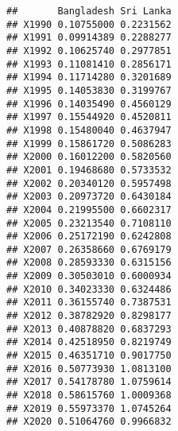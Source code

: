 \documentclass[
]{article}
\newenvironment{Shaded}{\begin{snugshade}}{\end{snugshade}}
\newcommand{\AttributeTok}[1]{\textcolor[rgb]{0.13,0.29,0.53}{#1}}
\newcommand{\CommentTok}[1]{\textcolor[rgb]{0.56,0.35,0.01}{\textit{#1}}}
\newcommand{\DecValTok}[1]{\textcolor[rgb]{0.00,0.00,0.81}{#1}}
\newcommand{\FunctionTok}[1]{\textcolor[rgb]{0.13,0.29,0.53}{\textbf{#1}}}
\newcommand{\NormalTok}[1]{#1}
\newcommand{\OtherTok}[1]{\textcolor[rgb]{0.56,0.35,0.01}{#1}}
\newcommand{\SpecialCharTok}[1]{\textcolor[rgb]{0.81,0.36,0.00}{\textbf{#1}}}
\newcommand{\StringTok}[1]{\textcolor[rgb]{0.31,0.60,0.02}{#1}}
\begin{document}
\begin{verbatim}
##       Bangladesh Sri Lanka
## X1990 0.10755000 0.2231562
## X1991 0.09914389 0.2288277
## X1992 0.10625740 0.2977851
## X1993 0.11081410 0.2856171
## X1994 0.11714280 0.3201689
## X1995 0.14053830 0.3199767
## X1996 0.14035490 0.4560129
## X1997 0.15544920 0.4520811
## X1998 0.15480040 0.4637947
## X1999 0.15861720 0.5086283
## X2000 0.16012200 0.5820560
## X2001 0.19468680 0.5733532
## X2002 0.20340120 0.5957498
## X2003 0.20973720 0.6430184
## X2004 0.21995500 0.6602317
## X2005 0.23213540 0.7108110
## X2006 0.25172190 0.6242808
## X2007 0.26358660 0.6769179
## X2008 0.28593330 0.6315156
## X2009 0.30503010 0.6000934
## X2010 0.34023330 0.6324486
## X2011 0.36155740 0.7387531
## X2012 0.38782920 0.8298177
## X2013 0.40878820 0.6837293
## X2014 0.42518950 0.8219749
## X2015 0.46351710 0.9017750
## X2016 0.50773930 1.0813100
## X2017 0.54178780 1.0759614
## X2018 0.58615760 1.0009368
## X2019 0.55973370 1.0745264
## X2020 0.51064760 0.9966832
\end{verbatim}

\begin{Shaded}
\end{Shaded}
\end{document}
